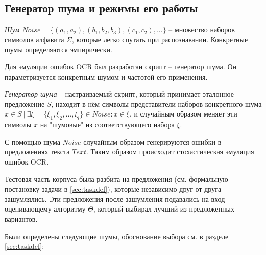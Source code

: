\subsection{ Генератор шума и режимы его работы }

\begin{definition}
	{\textit{Шум $Noise = \{ (a_1, a_2), (b_1, b_2, b_3), (c_1, c_2), ... \}$}} -- множество наборов символов алфавита $\Sigma$, которые легко спутать при распознавании. Конкретные шумы определяются эмпирически. 
\end{definition}

Для эмуляции ошибок OCR был разработан скрипт -- генератор шума. Он параметризуется конкретным шумом и частотой его применения.

\begin{definition}
	{\textit{Генератор шума}} -- настраиваемый скрипт, который принимает эталонное предложение $S$, находит в нём символы-представители наборов конкретного шума $x \in S\ |\ \exists \xi = \{ \xi_1, \xi_2, ..., \xi_l \} \in Noise : x \in \xi$, и случайным образом меняет эти символы $x$ на "шумовые" из соответствующего набора $\xi$.
\end{definition}

С помощью шума $Noise$ случайным образом генерируются ошибки в предложениях текста $Text$. Таким образом происходит стохастическая эмуляция ошибок OCR. 

Тестовая часть корпуса была разбита на предложения (см. формальную постановку задачи в \cref{sec:taskdef}), которые независимо друг от друга зашумлялись. Эти предложения после зашумления подавались на вход оценивающему алгоритму $\Theta$, который выбирал лучший из предложенных вариантов.

Были определены следующие шумы, обоснование выбора см. в разделе \cref{sec:taskdef}: 


